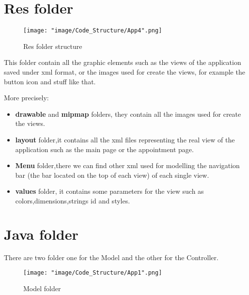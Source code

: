 \section{Res folder}

\begin{figure}[H]
\begin{center}
\texttt{[image: "image/Code\_Structure/App4".png]}
\caption{Res folder structure}
\end{center}
\end{figure}

This folder contain all the graphic elements such as  the views of the application saved under xml format, or the images used for create the views, for example the button icon and stuff like that.

More precisely:

\begin{itemize}

\item \textbf{drawable} and \textbf{mipmap} folders, they contain all the images used for create the views.

\item \textbf{layout} folder,it contains all the xml files representing the real view of the application such as the main page or the appointment page.

\item \textbf{Menu }folder,there we can find other xml used for modelling the navigation bar (the bar located on the top of each view) of each single view.

\item \textbf{values} folder, it contains some parameters for the view such as colors,dimensions,strings id and styles.  

\end{itemize}

\section{Java folder}

There are two folder one for the Model and the other for the Controller.

\begin{figure}[H]
\begin{center}
\texttt{[image: "image/Code\_Structure/App1".png]}
\caption{Model folder}
\end{center}
\end{figure}

